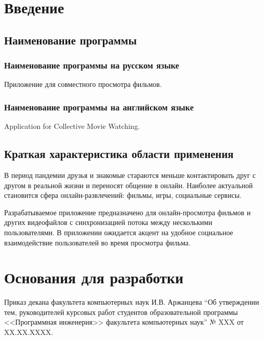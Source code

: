 \section{Введение}

\subsection{Наименование программы}

\subsubsection{Наименование программы на русском языке}

Приложение для совместного просмотра фильмов.

\subsubsection{Наименование программы на английском языке}

Application for Collective Movie Watching.

\subsection{Краткая характеристика области применения}

В период пандемии друзья и знакомые стараются меньше контактировать друг с другом в реальной жизни и переносят общение в онлайн.
Наиболее актуальной становится сфера онлайн-развлечений: фильмы, игры, социальные сервисы.

Разрабатываемое приложение предназначено для онлайн-просмотра фильмов и других видеофайлов с синхронизацией потока
между несколькими пользователями.
В приложении ожидается акцент на удобное социальное взаимодействие пользователей во время просмотра фильма.

\section{Основания для разработки}

Приказ декана факультета компьютерных наук И.В. Аржанцева ``Об утверждении тем, руководителей курсовых работ студентов
образовательной программы <<Программная инженерия>> факультета компьютерных наук'' № XXX от XX.XX.XXXX.

